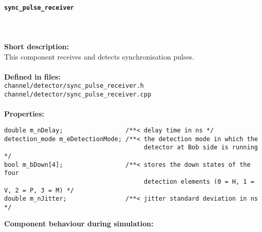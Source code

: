 \paragraph{\texttt{sync\_pulse\_receiver}}
\label{par:comp_detector_syncprcv}
\noindent \\
\\
\textbf{Short description:}\\
This component receives and detects synchronisation pulses.\\
\\
\textbf{Defined in files:}\\
\texttt{channel/detector/sync\_pulse\_receiver.h}\\
\texttt{channel/detector/sync\_pulse\_receiver.cpp}\\
\\
\textbf{Properties:}
\begin{lstlisting}
double m_nDelay;                 /**< delay time in ns */
detection_mode m_eDetectionMode; /**< the detection mode in which the
                                      detector at Bob side is running */
bool m_bDown[4];                 /**< stores the down states of the four
                                      detection elements (0 = H, 1 = V, 2 = P, 3 = M) */
double m_nJitter;                /**< jitter standard deviation in ns */
\end{lstlisting}
\noindent
\textbf{Component behaviour during simulation:}
